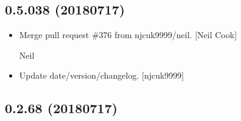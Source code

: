 \documentclass[a4paper,10pt,english]{report}
\begin{document}
\subsection{0.5.038 (2018\sphinxhyphen{}07\sphinxhyphen{}17)}
\label{\detokenize{misc/changelog:id408}}\begin{itemize}
\item {} 
Merge pull request \#376 from njcuk9999/neil. {[}Neil Cook{]}

Neil

\item {} 
Update date/version/changelog. {[}njcuk9999{]}

\end{itemize}


\subsection{0.2.68 (2018\sphinxhyphen{}07\sphinxhyphen{}17)}
\end{document}
